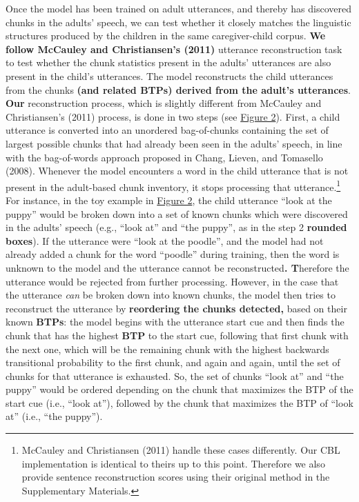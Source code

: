 \documentclass[
  english,
  man,mask,floatsintext]{apa6}
\begin{document}
Once the model has been trained on adult utterances, and thereby has discovered chunks in the adults' speech, we can test whether it closely matches the linguistic structures produced by the children in the same caregiver-child corpus. \textbf{We follow McCauley and Christiansen's (2011)} utterance reconstruction task to test whether the chunk statistics present in the adults' utterances are also present in the child's utterances. The model reconstructs the child utterances from the chunks \textbf{(and related BTPs) derived from the adult's utterances}. \textbf{Our} reconstruction process, which is slightly different from McCauley and Christiansen's (2011) process, is done in two steps (see \protect\hyperlink{fig2}{Figure 2}). First, a child utterance is converted into an unordered bag-of-chunks containing the set of largest possible chunks that had already been seen in the adults' speech, in line with the bag-of-words approach proposed in Chang, Lieven, and Tomasello (2008). Whenever the model encounters a word in the child utterance that is not present in the adult-based chunk inventory, it stops processing that utterance.\footnote{McCauley and Christiansen (2011) handle these cases differently. Our CBL implementation is identical to theirs up to this point. Therefore we also provide sentence reconstruction scores using their original method in the Supplementary Materials.} For instance, in the toy example in \protect\hyperlink{fig2}{Figure 2}, the child utterance \enquote{look at the puppy} would be broken down into a set of known chunks which were discovered in the adults' speech (e.g., \enquote{look at} and \enquote{the puppy}, as in the step 2 \textbf{rounded boxes}). If the utterance were \enquote{look at the poodle}, and the model had not already added a chunk for the word \enquote{poodle} during training, then the word is unknown to the model and the utterance cannot be reconstructed\textbf{. T}herefore the utterance would be rejected from further processing. However, in the case that the utterance \emph{can} be broken down into known chunks, the model then tries to reconstruct the utterance by \textbf{reordering the chunks detected,} based on their known \textbf{BTPs}: the model begins with the utterance start cue and then finds the chunk that has the highest \textbf{BTP} to the start cue, following that first chunk with the next one, which will be the remaining chunk with the highest backwards transitional probability to the first chunk, and again and again, until the set of chunks for that utterance is exhausted. So, the set of chunks \enquote{look at} and \enquote{the puppy} would be ordered depending on the chunk that maximizes the BTP of the start cue (i.e., \enquote{look at}), followed by the chunk that maximizes the BTP of \enquote{look at} (i.e., \enquote{the puppy}).
\end{document}
